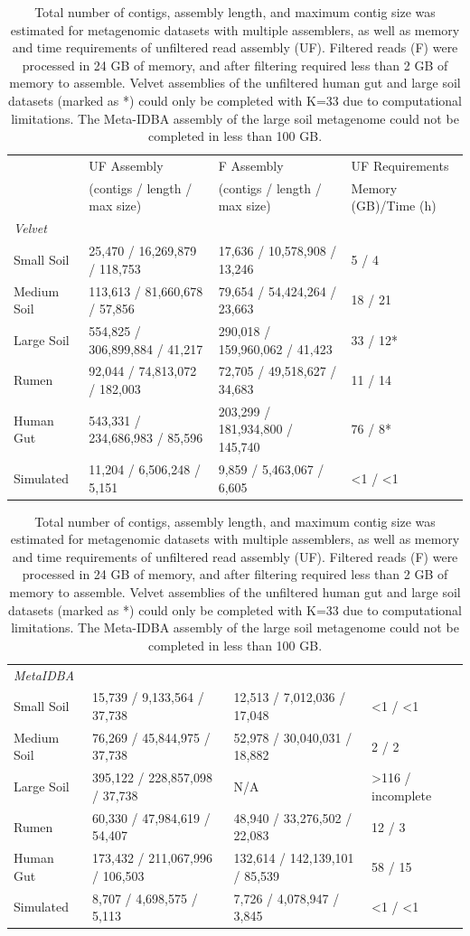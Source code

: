 \documentclass[10pt]{article}
\begin{document}
\begin{table}[h]
\caption{Total number of contigs, assembly length, and maximum contig size was estimated for metagenomic datasets with multiple assemblers, as well as memory and time requirements of unfiltered read assembly (UF).  Filtered reads (F) were processed in 24 GB of memory, and after filtering required less than 2 GB of memory to assemble.  Velvet assemblies of the unfiltered human gut and large soil datasets (marked as *) could only be completed with K=33 due to computational limitations.  The Meta-IDBA assembly of the large soil metagenome could not be completed in less than 100 GB.}
\begin{tabular}{l l l l}
\hline
&UF Assembly &F Assembly 	&UF Requirements \\
& (contigs / length / max size) 	& (contigs / length / max size) 	& Memory (GB)/Time (h)\\
\hline
\emph{Velvet}\\
Small Soil 	&25,470 / 16,269,879 / 118,753	&17,636 / 10,578,908 / 13,246		&5 / 4\\
Medium Soil	&113,613 / 81,660,678 / 57,856	&79,654 / 54,424,264 / 23,663		&18 / 21\\
Large Soil 	&554,825 / 306,899,884 / 41,217 	&290,018 / 159,960,062 /  41,423 	&33 / 12*\\
Rumen		&92,044 / 74,813,072 / 182,003	&72,705 / 49,518,627 / 34,683		&11 / 14\\
Human Gut	&543,331 / 234,686,983  / 85,596	&203,299 / 181,934,800 / 145,740	&76 / 8*\\
Simulated		&11,204 / 6,506,248 / 5,151		&9,859 / 5,463,067 / 6,605		&\textless1 / \textless1\\
\end{tabular}
\medskip
\begin{tabular}{l l l l}
\emph{MetaIDBA} \\ 
Small Soil		&15,739 / 9,133,564 / 37,738 		&12,513 / 7,012,036 / 17,048	&\textless1 / \textless 1 \\
Medium Soil	&76,269 / 45,844,975 / 37,738	 	&52,978 / 30,040,031 / 18,882	&2 / 2\\
Large Soil		&395,122 / 228,857,098 /  37,738	&N/A						&\textgreater116 / incomplete\\
Rumen		&60,330 / 47,984,619 / 54,407		&48,940 / 33,276,502 / 22,083		&12 / 3\\
Human Gut 	&173,432 / 211,067,996 / 106,503	&132,614 / 142,139,101 / 85,539	&58 / 15\\
Simulated		&8,707 / 4,698,575 / 5,113		&7,726 / 4,078,947 / 3,845		&\textless1 / \textless1\\

\end{tabular}
\end{table}
\end{document}
